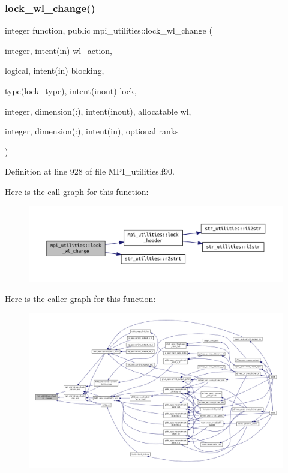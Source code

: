 \subsubsection{\texorpdfstring{lock\+\_\+wl\+\_\+change()}{lock\_wl\_change()}}
{\footnotesize\ttfamily integer function, public mpi\+\_\+utilities\+::lock\+\_\+wl\+\_\+change (\begin{DoxyParamCaption}\item[{integer, intent(in)}]{wl\+\_\+action,  }\item[{logical, intent(in)}]{blocking,  }\item[{type(lock\+\_\+type), intent(inout)}]{lock,  }\item[{integer, dimension(\+:), intent(inout), allocatable}]{wl,  }\item[{integer, dimension(\+:), intent(in), optional}]{ranks }\end{DoxyParamCaption})}



Definition at line 928 of file M\+P\+I\+\_\+utilities.\+f90.

Here is the call graph for this function\+:
\nopagebreak
\begin{figure}[H]
\begin{center}
\leavevmode
\includegraphics[width=350pt]{namespacempi__utilities_a0417983d618bfc9f892d6d2af5d27b1d_cgraph}
\end{center}
\end{figure}
Here is the caller graph for this function\+:
\nopagebreak
\begin{figure}[H]
\begin{center}
\leavevmode
\includegraphics[width=350pt]{namespacempi__utilities_a0417983d618bfc9f892d6d2af5d27b1d_icgraph}
\end{center}
\end{figure}
\mbox{\label{namespacempi__utilities_a128702990bd5fddc582e8fabcffc82b2}} 
